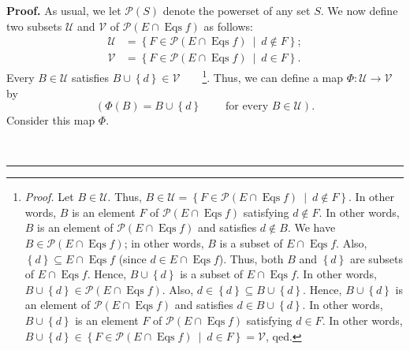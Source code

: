 \documentclass[numbers=enddot,12pt,final,onecolumn,notitlepage]{scrartcl}%
\theoremstyle{definition}
\newenvironment{proof}[1][Proof]{\noindent\textbf{#1.} }{\ \rule{0.5em}{0.5em}}
\newenvironment{verlong}{}{}
\begin{document}
\begin{verlong}
\begin{proof}
As usual, we let $\mathcal{P}\left(  S\right)  $ denote the powerset of any
set $S$. We now define two subsets $\mathcal{U}$ and $\mathcal{V}$ of
$\mathcal{P}\left(  E\cap\operatorname*{Eqs}f\right)  $ as follows:%
\begin{align*}
\mathcal{U}  &  =\left\{  F\in\mathcal{P}\left(  E\cap\operatorname*{Eqs}%
f\right)  \ \mid\ d\notin F\right\}  ;\\
\mathcal{V}  &  =\left\{  F\in\mathcal{P}\left(  E\cap\operatorname*{Eqs}%
f\right)  \ \mid\ d\in F\right\}  .
\end{align*}
Every $B\in\mathcal{U}$ satisfies $B\cup\left\{  d\right\}  \in\mathcal{V}%
$\ \ \ \ \footnote{\textit{Proof.} Let $B\in\mathcal{U}$. Thus, $B\in
\mathcal{U}=\left\{  F\in\mathcal{P}\left(  E\cap\operatorname*{Eqs}f\right)
\ \mid\ d\notin F\right\}  $. In other words, $B$ is an element $F$ of
$\mathcal{P}\left(  E\cap\operatorname*{Eqs}f\right)  $ satisfying $d\notin
F$. In other words, $B$ is an element of $\mathcal{P}\left(  E\cap
\operatorname*{Eqs}f\right)  $ and satisfies $d\notin B$. We have
$B\in\mathcal{P}\left(  E\cap\operatorname*{Eqs}f\right)  $; in other words,
$B$ is a subset of $E\cap\operatorname*{Eqs}f$. Also, $\left\{  d\right\}
\subseteq E\cap\operatorname*{Eqs}f$ (since $d\in E\cap\operatorname*{Eqs}f$).
Thus, both $B$ and $\left\{  d\right\}  $ are subsets of $E\cap
\operatorname*{Eqs}f$. Hence, $B\cup\left\{  d\right\}  $ is a subset of
$E\cap\operatorname*{Eqs}f$. In other words, $B\cup\left\{  d\right\}
\in\mathcal{P}\left(  E\cap\operatorname*{Eqs}f\right)  $. Also, $d\in\left\{
d\right\}  \subseteq B\cup\left\{  d\right\}  $. Hence, $B\cup\left\{
d\right\}  $ is an element of $\mathcal{P}\left(  E\cap\operatorname*{Eqs}%
f\right)  $ and satisfies $d\in B\cup\left\{  d\right\}  $. In other words,
$B\cup\left\{  d\right\}  $ is an element $F$ of $\mathcal{P}\left(
E\cap\operatorname*{Eqs}f\right)  $ satisfying $d\in F$. In other words,
$B\cup\left\{  d\right\}  \in\left\{  F\in\mathcal{P}\left(  E\cap
\operatorname*{Eqs}f\right)  \ \mid\ d\in F\right\}  =\mathcal{V}$, qed.}.
Thus, we can define a map $\Phi:\mathcal{U}\rightarrow\mathcal{V}$ by%
\[
\left(  \Phi\left(  B\right)  =B\cup\left\{  d\right\}
\ \ \ \ \ \ \ \ \ \ \text{for every }B\in\mathcal{U}\right)  .
\]
Consider this map $\Phi$.


\end{proof}
\end{verlong}
\end{document}
